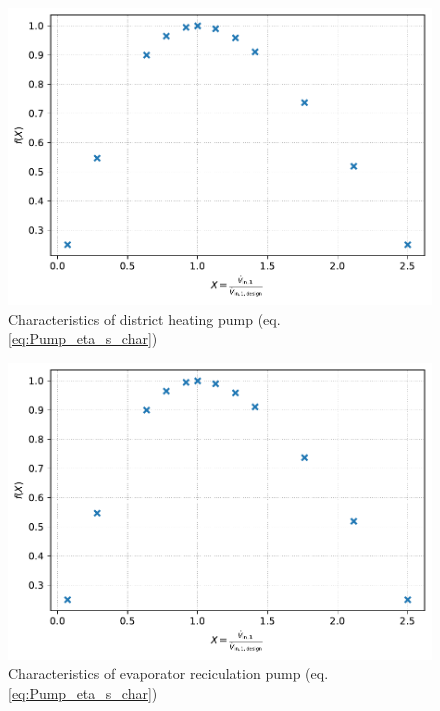 \begin{minipage}{0.5\textwidth}
\begin{figure}[H]\begin{center}
\includegraphics[width=\textwidth]{figures/Pump_CharLine_eta_s_char_district_heating_pump.pdf}
\caption{Characteristics of district heating pump (eq. \ref{eq:Pump_eta_s_char})}
\label{fig:CharLine_eta_s_char_district heating pump}
\end{center}\end{figure}

\end{minipage}
\begin{minipage}{0.5\textwidth}
\begin{figure}[H]\begin{center}
\includegraphics[width=\textwidth]{figures/Pump_CharLine_eta_s_char_evaporator_reciculation_pump.pdf}
\caption{Characteristics of evaporator reciculation pump (eq. \ref{eq:Pump_eta_s_char})}
\label{fig:CharLine_eta_s_char_evaporator reciculation pump}
\end{center}\end{figure}

\end{minipage}

